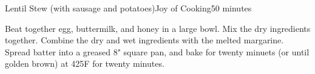 \begin{recipe}{Lentil Stew (with sausage and potatoes)}{Joy of Cooking}{50 minutes}

  Beat together egg, buttermilk, and honey in a large bowl. Mix the
  dry ingredients together. Combine the dry and wet ingredients with
  the melted margarine. Spread batter into a greased 8" square pan,
  and bake for twenty minuets (or until golden brown) at 425\0F for
  twenty minutes.
\end{recipe}